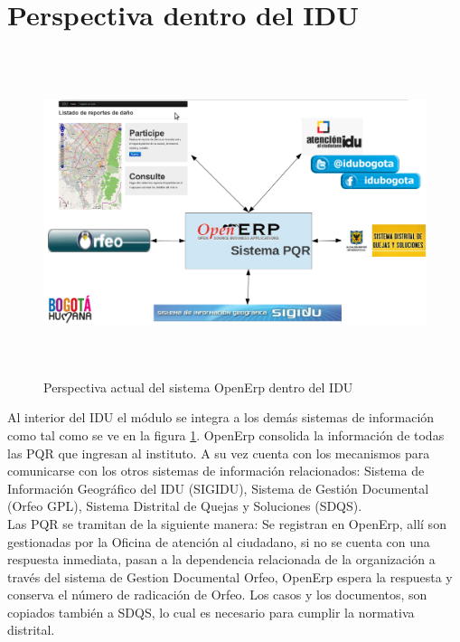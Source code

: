 \section{Perspectiva dentro del IDU}

\begin{figure}[h]
 \includegraphics[width=17cm,height=9.5cm]{./Imagenes/slidesistemacompleto.png}
 \caption{Perspectiva actual del sistema OpenErp dentro del IDU}
 \label{fig:menulista}
\end{figure}

Al interior del IDU el módulo se integra a los demás sistemas de información como tal como se ve en la figura \ref{fig:menulista}. OpenErp consolida la 
información de todas las PQR que ingresan al instituto. A su vez cuenta con los mecanismos para comunicarse con los otros sistemas de información 
relacionados: Sistema de Información Geográfico del IDU (SIGIDU), Sistema de Gestión Documental (Orfeo GPL), Sistema Distrital de 
Quejas y Soluciones (SDQS). \\

Las PQR se tramitan de la siguiente manera: Se registran en OpenErp, allí son gestionadas por la Oficina de atención al ciudadano,
si no se cuenta con una respuesta inmediata, pasan a la dependencia relacionada de la organización a través del
sistema de Gestion Documental Orfeo, OpenErp espera la respuesta y conserva el número de radicación de Orfeo. Los casos y los documentos, son copiados también 
a SDQS, lo cual es necesario para cumplir la normativa distrital.\\

